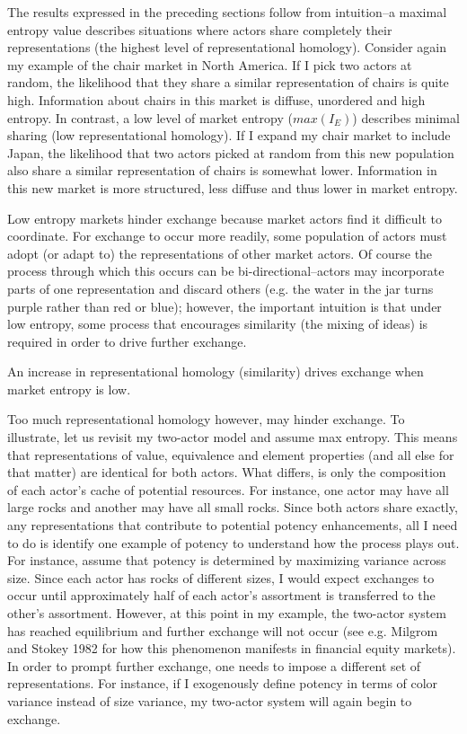 The results expressed in the preceding sections follow from intuition--a maximal entropy value describes situations where actors share completely their representations (the highest level of representational homology). Consider again my example of the chair market in North America. If I pick two actors at random, the likelihood that they share a similar representation of chairs is quite high. Information about chairs in this market is diffuse, unordered and high entropy. In contrast, a low level of market entropy ($max(I_E)$) describes minimal sharing (low representational homology). If I expand my chair market to include Japan, the likelihood that two actors picked at random from this new population also share a similar representation of chairs is somewhat lower. Information in this new market is more structured, less diffuse and thus lower in market entropy. 
 
Low entropy markets hinder exchange because market actors find it difficult to coordinate. For exchange to occur more readily, some population of actors must adopt (or adapt to) the representations of other market actors. Of course the process through which this occurs can be bi-directional--actors may incorporate parts of one representation and discard others (e.g. the water in the jar turns purple rather than red or blue); however, the important intuition is that under low entropy, some process that encourages similarity (the mixing of ideas) is required in order to drive further exchange.
 
\begin{prop}
An increase in representational homology (similarity) drives exchange when market entropy is low.
\end{prop}

Too much representational homology however, may hinder exchange. To illustrate, let us revisit my two-actor model and assume max entropy. This means that representations of value, equivalence and element properties (and all else for that matter) are identical for both actors. What differs, is only the composition of each actor's cache of potential resources. For instance, one actor may have all large rocks and another may have all small rocks. Since both actors share exactly, any representations that contribute to potential potency enhancements, all I need to do is identify one example of potency to understand how the process plays out. For instance, assume that potency is determined by maximizing variance across size. Since each actor has rocks of different sizes, I would expect exchanges to occur until approximately half of each actor's assortment is transferred to the other's assortment. However, at this point in my example, the two-actor system has reached equilibrium and further exchange will not occur (see e.g. Milgrom and Stokey 1982 for how this phenomenon manifests in financial equity markets). In order to prompt further exchange, one needs to impose a different set of representations. For instance, if I exogenously define potency in terms of color variance instead of size variance, my two-actor system will again begin to exchange.
 
